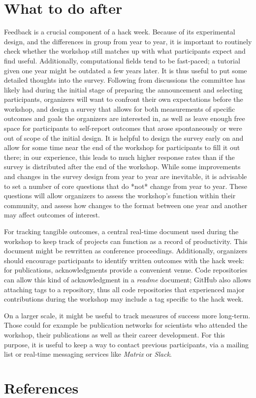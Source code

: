 \documentclass{nature}
\begin{document}
\section{What to do after}

Feedback is a crucial component of a hack week. Because of its experimental design, and the differences in group from year to year, it is important to routinely check whether the workshop still matches up with what participants expect and find useful. Additionally, computational fields tend to be fast-paced; a tutorial given one year might be outdated a few years later. It is thus useful to put some detailed thoughts into the survey. Following from discussions the committee has likely had during the initial stage of preparing the announcement and selecting participants, organizers will want to confront their own expectations before the workshop, and design a survey that allows for both measurements of specific outcomes and goals the organizers are interested in, as well as leave enough free space for participants to self-report outcomes that arose spontaneously or were out of scope of the initial design. It is helpful to design the survey early on and allow for some time near the end of the workshop for participants to fill it out there; in our experience, this leads to much higher response rates than if the survey is distributed after the end of the workshop. While some improvements and changes in the survey design from year to year are inevitable, it is advisable to set a number of core questions that do *not* change from year to year. These questions will allow organizers to assess the workshop's function within their community, and assess how changes to the format between one year and another may affect outcomes of interest.

For tracking tangible outcomes, a central real-time document used during the workshop to keep track of projects can function as a record of productivity. This document might be rewritten as conference proceedings. Additionally, organizers should encourage participants to identify written outcomes with the hack week: for publications, acknowledgments provide a convenient venue. Code repositories can allow this kind of acknowledgment in a \textit{readme} document; GitHub also allows attaching tags to a repository, thus all code repositories that experienced major contributions during the workshop may include a tag specific to the hack week.

On a larger scale, it might be useful to track measures of success more long-term. Those could for example be publication networks for scientists who attended the workshop, their publications as well as their career development. For this purpose, it is useful to keep a way to contact previous participants, via a mailing list or real-time messaging services like \textit{Matrix} or \textit{Slack}.


\section{References}


\end{document}
